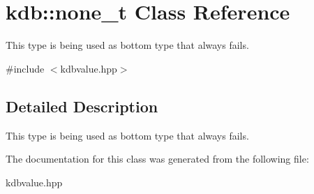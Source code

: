 \hypertarget{classkdb_1_1none__t}{\section{kdb\+:\+:none\+\_\+t Class Reference}
\label{classkdb_1_1none__t}
}


This type is being used as bottom type that always fails.  




{\ttfamily \#include $<$kdbvalue.\+hpp$>$}



\subsection{Detailed Description}
This type is being used as bottom type that always fails. 

The documentation for this class was generated from the following file\+:\begin{DoxyCompactItemize}
\item 
kdbvalue.\+hpp\end{DoxyCompactItemize}
